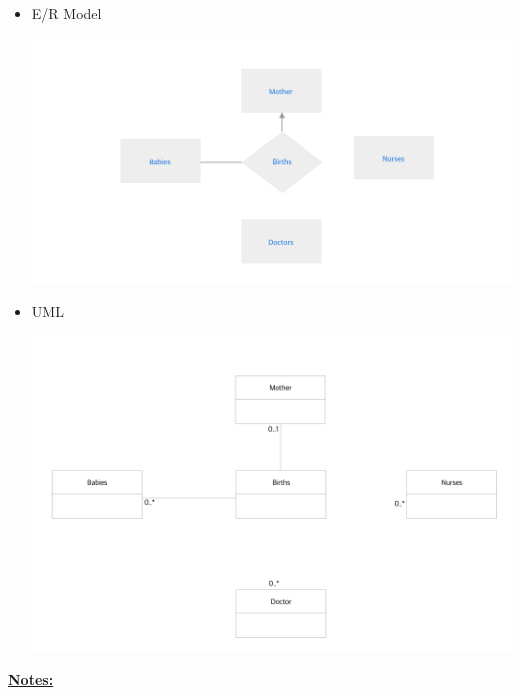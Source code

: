 \documentclass[12pt]{article}
\begin{document}
\begin{enumerate}[1.]
\begin{enumerate}[a)]
\begin{mdframed}
            \bigskip

            \begin{itemize}
                \item E/R Model
                \begin{center}
                \includegraphics[width=\linewidth]{images/worksheet_15_solution_28.png}
                \end{center}

                \item UML

                \begin{center}
                \includegraphics[width=\linewidth]{images/worksheet_15_solution_29.png}
                \end{center}
            \end{itemize}

        \end{mdframed}

        \bigskip

        \underline{\textbf{Notes:}}


\end{enumerate}
\end{enumerate}
\end{document}
